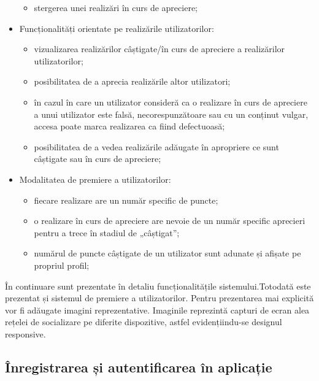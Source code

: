 \begin{itemize}
\begin{itemize}
            \item stergerea unei realizări în curs de apreciere;
        \end{itemize}  
    \item{Funcționalități orientate pe realizările utilizatorilor:} 
        \begin{itemize}
            \item vizualizarea realizărilor câștigate/în curs de apreciere a realizărilor utilizatorilor;
            \item posibilitatea de a aprecia realizările altor utilizatori;
            \item în cazul în care un utilizator consideră ca o realizare în curs de apreciere a unui utilizator este 
            falsă, necorespunzătoare sau cu un conținut vulgar, accesa poate marca realizarea ca fiind defectuoasă;
            \item posibilitatea de a vedea realizările adăugate în apropriere ce sunt câștigate sau în curs de apreciere;
        \end{itemize}  
    \item{Modalitatea de premiere a utilizatorilor:} 
        \begin{itemize}
            \item fiecare realizare are un număr specific de puncte;
            \item o realizare în curs de apreciere are nevoie de un număr specific aprecieri pentru a trece în
            stadiul de „câștigat”;
            \item numărul de puncte câștigate de un utilizator sunt adunate și afișate pe propriul profil;
        \end{itemize}  
\end{itemize}


În continuare sunt prezentate în detaliu funcționalitățile sistemului.Totodată este prezentat 
și sistemul de premiere a utilizatorilor. Pentru prezentarea mai explicită vor fi adăugate imagini reprezentative. 
Imaginile reprezintă capturi de ecran alea rețelei de socializare pe diferite dispozitive, astfel evidențiindu-se designul responsive.  
\subsection{Înregistrarea și autentificarea în aplicație} 
 
